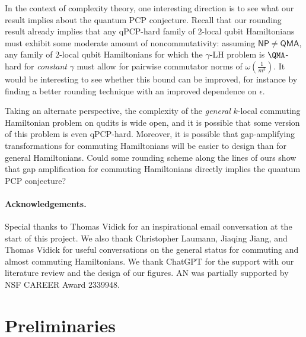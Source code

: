 \documentclass[a4paper,onecolumn,11pt]{quantumarticle}
\theoremstyle{plain}
\begin{document}
In the context of complexity theory, one interesting direction is to see what our result implies about the quantum PCP conjecture. Recall that our rounding result already implies that any qPCP-hard family of 2-local qubit Hamiltonians must exhibit some moderate amount of noncommutativity: assuming $\mathsf{NP} \neq \mathsf{QMA}$, any
family of $2$-local qubit Hamiltonians for which the $\gamma$-LH problem is $\QMA$-hard for \emph{constant} $\gamma$ must allow for pairwise commutator norms of $\omega(\frac{1}{m^3})$. It would be interesting to see whether this bound can be improved, for instance by finding a better rounding technique with an improved dependence on $\epsilon$.

Taking an alternate perspective, the complexity of the \emph{general} $k$-local commuting Hamiltonian problem on qudits is wide open, and it is possible that some version of this problem is even qPCP-hard. Moreover, it is possible that gap-amplifying transformations for commuting Hamiltonians will be easier to design than for general Hamiltonians. Could some rounding scheme along the lines of ours show that gap amplification for commuting Hamiltonians directly implies the quantum PCP conjecture?

\paragraph{Acknowledgements.}
Special thanks to Thomas Vidick for an inspirational email conversation at the start of this project. We also thank Christopher Laumann, Jiaqing Jiang, and Thomas Vidick for useful conversations on the general status for commuting and almost commuting Hamiltonians. We thank ChatGPT for the support with our literature review and the design of our figures. AN was partially supported by NSF CAREER Award 2339948.

\section{Preliminaries}
\label{sec:background}
\end{document}
